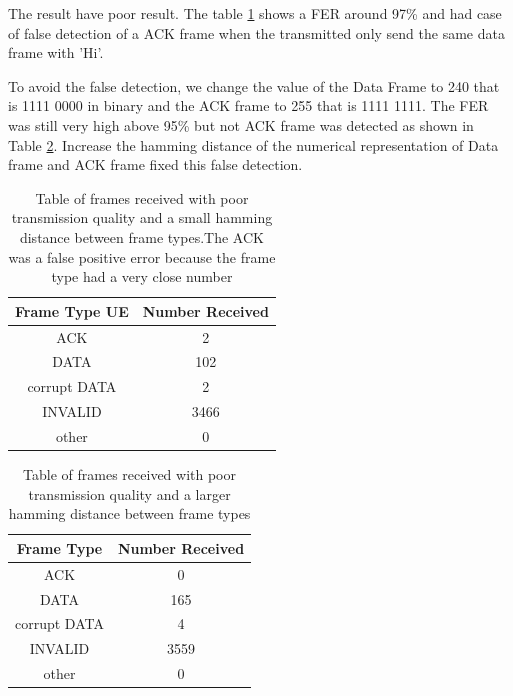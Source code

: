 The result have poor result. The table \ref{tab:2ACK} shows a FER around 97\% and had case of false detection of a ACK frame when the transmitted only send
the same data frame with 'Hi'.  


To avoid the false detection, we change the value of the Data Frame to 240 that is 1111 0000 in binary and the ACK frame to 255 that is 1111 1111.
The FER was still very high above 95\% but not ACK frame was detected as shown in Table \ref{tab:0ACK}. Increase the hamming distance of the numerical representation of Data frame and ACK frame 
fixed this false detection.
 




\begin{table}[ht]
	\centering
		\begin{tabular}{| c | c | }
		\hline                       
		Frame Type UE & Number Received\\
		\hline
			ACK & 2\\
			DATA & 102\\
			corrupt DATA & 2\\
			INVALID & 3466\\
			other & 0\\
		\hline
		\end{tabular}
	\caption{Table of frames received with poor transmission quality and a small hamming distance between frame types.The ACK was a false positive error because the frame type had a very close number}
	\label{tab:2ACK}
\end{table}

\begin{table}[ht]
	\centering
		\begin{tabular}{| c | c | }
		\hline                       
		Frame Type & Number Received\\
		\hline
			ACK & 0\\
			DATA & 165\\
			corrupt DATA & 4\\
			INVALID & 3559\\
			other & 0\\
		\hline
		\end{tabular}
	\caption{Table of frames received with poor transmission quality and a larger hamming distance between frame types}
	\label{tab:0ACK}
\end{table}

